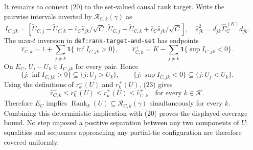 It remains to connect (20) to the set-valued causal rank target.  Write the pairwise intervals inverted by \(\mathcal R_{C,k}(\gamma)\) as
\[
 I_{C,jk}=\left[
  \widetilde U_{C,j}-\widetilde U_{C,k}
  \mathbin{-}\widehat c_C\widehat s_{jk}/\sqrt C,
  \widetilde U_{C,j}-\widetilde U_{C,k}
  \mathbin{+}\widehat c_C\widehat s_{jk}/\sqrt C
 \right],
 \quad
 \widehat s_{jk}^2=d_{jk}^{\prime}\widehat\Sigma_C^{(K)}d_{jk}.              \tag{21}
\]
The max-\(t\) inversion in \texttt{def:rank-target-and-set} has endpoints
\[
 \widehat r^-_{C,k}=1+\sum_{j\ne k}\mathbf 1\{\inf I_{C,jk}>0\},
 \qquad
 \widehat r^+_{C,k}=K-\sum_{j\ne k}\mathbf 1\{\sup I_{C,jk}<0\}.           \tag{22}
\]
On \(E_C\), \(U_j-U_k\in I_{C,jk}\) for every pair.  Hence
\[
 \{j:\inf I_{C,jk}>0\}\subseteq\{j:U_j>U_k\},
 \qquad
 \{j:\sup I_{C,jk}<0\}\subseteq\{j:U_j<U_k\}.                              \tag{23}
\]
Using the definitions of \(r_k^-(U)\) and \(r_k^+(U)\), (23) gives
\[
 \widehat r^-_{C,k}\leq r_k^-(U)\leq r_k^+(U)\leq\widehat r^+_{C,k}
 \quad\text{for every }k\in\mathcal K.                                      \tag{24}
\]
Therefore \(E_C\) implies
\(\operatorname{Rank}_k(U)\subseteq\mathcal R_{C,k}(\gamma)\) simultaneously for every \(k\).  Combining this deterministic implication with (20) proves the displayed coverage bound.  No step imposed a positive separation between any two components of \(U\); equalities and sequences approaching any partial-tie configuration are therefore covered uniformly.